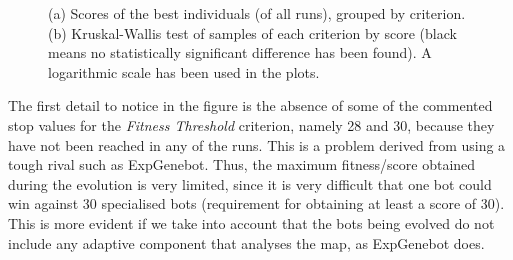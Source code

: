 \documentclass[runningheads,a4paper]{llncs}
\begin{document}
\begin{figure}
\begin{center}
\end{center} 
\caption{(a) Scores of the best individuals (of all runs), grouped by criterion. (b) Kruskal-Wallis test of samples of each criterion by score (black means no statistically significant difference has been found). A logarithmic scale has been used in the plots.}
\label{fig:boxplotscore}
\end{figure}



The first detail to notice in the figure is the absence of some of the commented stop values for the \textit{Fitness Threshold} criterion, namely 28 and 30, because they have not been reached in any of the runs.
This is a problem derived from using a tough rival such as ExpGenebot. Thus, the maximum fitness/score obtained during the evolution is very limited, since it is very difficult that one bot could win against 30 specialised bots \cite{Wolpert97nofree} (requirement for obtaining at least a score of 30). This is more evident if we take into account that the bots being evolved do not include any adaptive component that analyses the map, as ExpGenebot does. 
\end{document}
